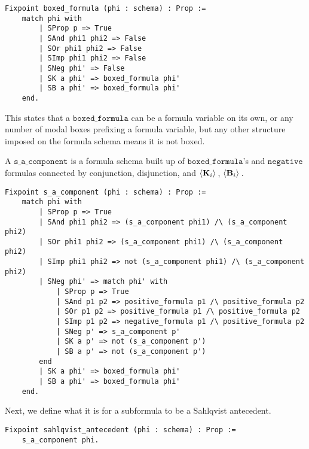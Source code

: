 \begin{tcolorbox}
	\begin{lstlisting}[language=Coq]
Fixpoint boxed_formula (phi : schema) : Prop :=
	match phi with
		| SProp p => True
		| SAnd phi1 phi2 => False
		| SOr phi1 phi2 => False
		| SImp phi1 phi2 => False
		| SNeg phi' => False
		| SK a phi' => boxed_formula phi'
		| SB a phi' => boxed_formula phi'
	end.
	\end{lstlisting}	
	
\end{tcolorbox}

This states that a $\mathtt{boxed\_formula}$ can be a formula variable on its own, or any number of modal boxes prefixing a formula variable, but any other structure imposed on the formula schema means it is not boxed.

A $\mathtt{s\_a\_component}$ is a formula schema built up of $\mathtt{boxed\_formula}$'s and $\mathtt{negative}$ formulas connected by conjunction, disjunction, and $\langle \mathbf{K}_{i} \rangle\,$, $\langle \mathbf{B}_{i} \rangle\,$.

\begin{tcolorbox}
	\begin{lstlisting}[language=Coq]
Fixpoint s_a_component (phi : schema) : Prop :=
	match phi with
		| SProp p => True
		| SAnd phi1 phi2 => (s_a_component phi1) /\ (s_a_component phi2)
		| SOr phi1 phi2 => (s_a_component phi1) /\ (s_a_component phi2)
		| SImp phi1 phi2 => not (s_a_component phi1) /\ (s_a_component phi2)
		| SNeg phi' => match phi' with
			| SProp p => True
			| SAnd p1 p2 => positive_formula p1 /\ positive_formula p2
			| SOr p1 p2 => positive_formula p1 /\ positive_formula p2
			| SImp p1 p2 => negative_formula p1 /\ positive_formula p2
			| SNeg p' => s_a_component p'
			| SK a p' => not (s_a_component p')
			| SB a p' => not (s_a_component p')
		end
		| SK a phi' => boxed_formula phi'
		| SB a phi' => boxed_formula phi'
	end.
	\end{lstlisting}	
	
\end{tcolorbox}

Next, we define what it is for a subformula to be a Sahlqvist antecedent.

\begin{tcolorbox}
\begin{lstlisting}[language=Coq]
Fixpoint sahlqvist_antecedent (phi : schema) : Prop :=
	s_a_component phi.
\end{lstlisting}
\end{tcolorbox}

